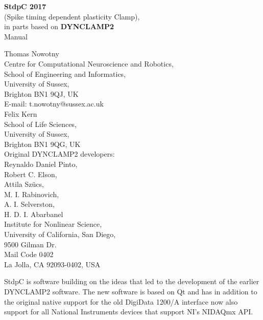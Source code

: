 \documentclass{article}
\begin{document}
\begin{titlepage}
  \begin{center}
  {{\bf \Large 
    StdpC 2017 }\\[0.3cm]
    \large (Spike timing dependent plasticity Clamp)}, \\[1cm]
  {\large 
    in parts based on {\bf DYNCLAMP2} \cite{Pinto2001} 
  } \\[2cm]
  {\sc \Large Manual }
  \end{center}
\vspace*{2cm}

\noindent
{\large Thomas Nowotny} \\[0.5cm]
Centre for Computational Neuroscience and Robotics, \\
School of Engineering and Informatics, \\
University of Sussex, \\
Brighton BN1 9QJ, UK \\
E-mail: t.nowotny@sussex.ac.uk
 \\[1cm]
{\large Felix Kern} \\[0.5cm]
School of Life Sciences, \\
University of Sussex, \\
Brighton BN1 9QG, UK
 \\[1cm]
Original DYNCLAMP2 developers: \\[0.2cm]
Reynaldo Daniel Pinto, \\
Robert C. Elson, \\
Attila Sz\"ucs, \\
M. I. Rabinovich, \\
A. I. Selverston,  \\
H. D. I. Abarbanel \\[0.5cm]
Institute for Nonlinear Science, \\
University of California, San Diego, \\
9500 Gilman Dr. \\ Mail Code 0402 \\
La Jolla, CA 92093-0402, USA \\

\end{titlepage}

StdpC is software building on the ideas that led
to the development of the earlier DYNCLAMP2
software. The new software is based on Qt and has in addition to the
original native support for the old DigiData 1200/A interface now also
support for all National Instruments devices that support NI's NIDAQmx
API.
 
\end{document}
